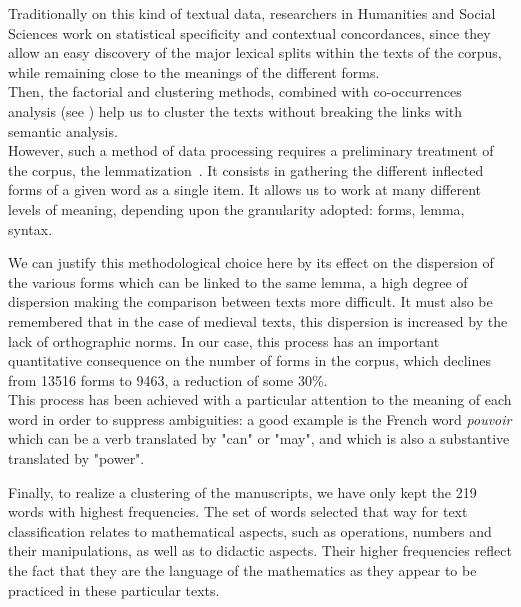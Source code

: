 \documentclass[preprint]{elsarticle}
\begin{document}
Traditionally on this kind of textual data, researchers in Humanities and Social Sciences work on statistical specificity and contextual concordances, since they allow an easy discovery of the major lexical splits within the texts of the corpus, while remaining close to the meanings of the different forms.\\

Then, the factorial and clustering methods, combined with co-occurrences analysis (see \cite{martinezcontribution2003}) help us to cluster the texts without breaking the links with semantic analysis.\\

However, such a method of data processing requires a preliminary treatment of the corpus, the lemmatization~\cite{brunet2000}. It consists in gathering the different inflected forms of a given word as a single item. It allows us to work at many different levels of meaning, depending upon the granularity adopted: forms, lemma, syntax. 

We can justify this methodological choice here by its effect on the dispersion of the various forms which can be linked to the same lemma, a high degree of dispersion making the comparison between texts more difficult. It must also be remembered that in the case of medieval texts, this dispersion is increased by the lack of orthographic norms. In our case, this process has an important quantitative consequence on the number of forms in the corpus, which declines from 13516 forms to 9463, a reduction of some 30\%.\\


This process has been achieved with a particular attention to the meaning of each word in order to suppress ambiguities: a good example is the French word \textit{pouvoir} which can be a verb translated by "can" or "may", and which is also a substantive translated by "power".

Finally, to realize a clustering of the manuscripts, we have only kept the 219 words with highest frequencies. The set of words selected that way for text classification relates to mathematical aspects, such as operations, numbers and their manipulations, as well as to didactic aspects. Their higher frequencies reflect the fact that they are the language of the mathematics as they appear to be practiced in these particular texts. 
\end{document}

